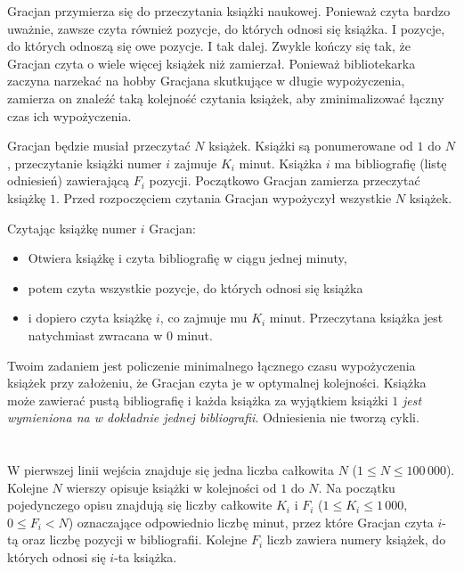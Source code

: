 \ifx\boi\undefined\fi
\def\version{jury-1}

Gracjan przymierza się do przeczytania książki naukowej.
Ponieważ czyta bardzo uważnie, zawsze czyta również pozycje, do których odnosi się
książka. I pozycje, do których odnoszą się owe pozycje.
I tak dalej. Zwykle kończy się tak, że Gracjan czyta o wiele więcej książek
niż zamierzał.
Ponieważ bibliotekarka zaczyna narzekać na hobby Gracjana
skutkujące w długie wypożyczenia, zamierza on znaleźć taką kolejność
czytania książek, aby zminimalizować łączny czas ich wypożyczenia.

Gracjan będzie musiał przeczytać $N$ książek.
Książki są ponumerowane od $1$ do $N$, przeczytanie książki numer $i$ zajmuje $K_i$ minut.
Książka $i$ ma bibliografię (listę odniesień) zawierającą $F_i$ pozycji.
Początkowo Gracjan zamierza przeczytać książkę $1$.
Przed rozpoczęciem czytania Gracjan wypożyczył wszystkie $N$ książek.


Czytając książkę numer $i$ Gracjan:
\begin{itemize}
\item Otwiera książkę i czyta bibliografię w ciągu jednej minuty,
\item potem czyta wszystkie pozycje, do których odnosi się książka
\item i dopiero czyta książkę $i$, co zajmuje mu $K_i$ minut. Przeczytana książka jest natychmiast zwracana w 0 minut.
\end{itemize}

Twoim zadaniem jest policzenie minimalnego łącznego czasu wypożyczenia książek przy założeniu, że Gracjan czyta
je w optymalnej kolejności. Książka może zawierać pustą bibliografię i każda książka za wyjątkiem książki $1$
{\em jest wymieniona na w dokładnie jednej bibliografii}. Odniesienia nie tworzą cykli.

\section*{}
W pierwszej linii wejścia znajduje się jedna liczba całkowita $N$ ($1 \le N \le 100\,000$).
Kolejne $N$ wierszy opisuje książki w kolejności od $1$ do $N$.
Na początku pojedynczego opisu znajdują się liczby całkowite $K_i$ i $F_i$ ($1 \le K_i \le 1\,000$, $0 \le F_i < N$)
oznaczające odpowiednio liczbę minut, przez które Gracjan czyta $i$-tą oraz liczbę pozycji w bibliografii.
Kolejne $F_i$ liczb zawiera numery książek, do których odnosi się $i$-ta książka.

